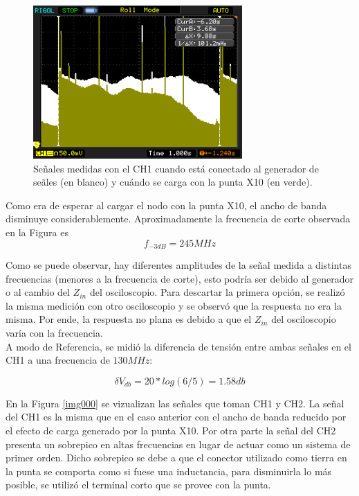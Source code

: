 \documentclass[a4paper,10pt]{article}
\begin{document}
		\begin{figure}[!htb]
			\centering
			\includegraphics[width=8cm]
			{Imagenes/Mediciones instrumentos/NewFile1.png}
			\caption{Se\~nales medidas con el CH1 cuando est\'a conectado al 
			generador de se\~ales (en blanco) y cu\'ando se carga con la punta
			X10 (en verde).} \label{img001}
		\end{figure}
			
		\indent Como era de esperar al cargar el nodo con la punta X10, el 
		ancho de banda disminuye considerablemente. Aproximadamente la 
		frecuencia de corte observada en la Figura es $$f_{-3dB}=245MHz$$

		\indent Como se puede observar, hay diferentes amplitudes de la señal
		medida a distintas frecuencias (menores a la frecuencia de corte), 
		esto podría ser debido al generador o al cambio del $Z_{in}$ del 
		osciloscopio. Para descartar la primera opción, se realizó la misma
		medición con otro osciloscopio y se observó que la respuesta no era la
		misma. Por ende, la respuesta no plana es debido a que el $Z_{in}$ del
		osciloscopio varía con la frecuencia.\\
		\indent A modo de Referencia, se midió la diferencia de tensión entre
		ambas señales en el CH1 a una frecuencia de $130MHz$:

		\begin{equation*}
			\delta V_{db} = 20*log(6/5) = 1.58 db 
		\end{equation*}

		\indent En la Figura \ref{img000} se vizualizan las se\~nales que 
		toman CH1 y CH2. La se\~nal del CH1 es la misma que en el caso 
		anterior con el ancho de banda reducido por el efecto de carga 
		generado por la punta X10. Por otra parte la se\~nal del CH2 presenta
		un sobrepico en altas frecuencias en lugar de actuar como un sistema 
		de primer orden. Dicho sobrepico se debe a que el conector utilizado 
		como tierra en la punta se comporta como si fuese una inductancia, 
		para disminuirla lo más posible, se utilizó el terminal corto que
		se provee con la punta. \\
		
\end{document}
